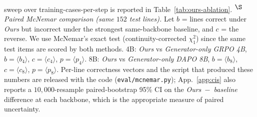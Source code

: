 \begin{table}[ht]
sweep over training-cases-per-step is reported in
Table~\ref{tab:ours-ablation}.
\textsuperscript{$\S$}\,\emph{Paired McNemar comparison (same $152$ test
lines).} Let $b$ = lines correct under \emph{Ours} but incorrect under
the strongest same-backbone baseline, and $c$ = the reverse. We use
McNemar's exact test (continuity-corrected $\chi^2_{1}$) since the same
test items are scored by both methods. \textsc{4B}: \emph{Ours} vs
\emph{Generator-only GRPO 4B}, $b{=}\langle b_{4}\rangle$,
$c{=}\langle c_{4}\rangle$, $p{=}\langle p_{4}\rangle$.
\textsc{8B}: \emph{Ours} vs \emph{Generator-only DAPO 8B},
$b{=}\langle b_{8}\rangle$, $c{=}\langle c_{8}\rangle$,
$p{=}\langle p_{8}\rangle$. Per-line correctness vectors and the
script that produced these numbers are released with the code
(\texttt{eval/mcnemar.py}); App.~\ref{app:cis} also reports a
$10{,}000$-resample paired-bootstrap 95\% CI on the
\emph{Ours~$-$~baseline} difference at each backbone, which is the
appropriate measure of paired uncertainty.
\end{table}


